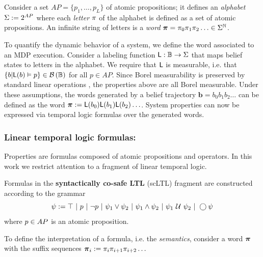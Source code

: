 \documentclass{ifacconf}
\begin{document}
Consider a set $AP = \{ p_1, \ldots, p_L \}$ of atomic propositions; it defines an \emph{alphabet} $\Sigma := 2^{AP}$ where each \emph{letter} $\pi$ of the alphabet is defined as a set of atomic propositions. An infinite string of letters is a \emph{word} ${\boldsymbol{\pi}}=\pi_0\pi_1\pi_2\ldots\in\Sigma^{\mathbb{N}}$.

To quantify the dynamic behavior of a system, we define the word associated to an MDP execution. Consider a labeling function $\mathsf{L}:\mathbb{B}\rightarrow \Sigma$ that maps belief states to letters in the alphabet. We require that $\mathsf{L}$ is measurable, i.e. that $\{b|\mathsf{L}(b)\vDash p \}\in \mathcal{B}\left(\mathbb{B}\right)$ for all $p \in AP$. Since Borel measurability is preserved by standard linear operations \citep{azoff1974borel}%
, the properties above are all Borel measurable. Under these assumptions, the words generated by a belief trajectory $\mathbf{b} = b_0 b_1 b_2 \ldots$ can be defined as the word ${\boldsymbol{\pi}}:=\mathsf{L}(b_0)\mathsf{L}(b_1) \mathsf{L}(b_2) \ldots$. System properties can now be expressed via temporal logic formulas over the generated words. 
  
\subsubsection{Linear temporal logic formulas:}

Properties are formulas composed of atomic propositions and operators. In this work we restrict attention to a fragment of linear temporal logic. 
\begin{definition}
  \label{def:gdtl-syntax}
  Formulas in the \textbf{syntactically co-safe LTL} (scLTL) fragment are constructed according to the grammar
  \begin{equation*}
    \label{eq:scLTL}
    \psi :=  \True \ |\ p \ |\ \notltl p \ |\ \psi_1 \vee\psi_2  \ |\ \psi_1 \andltl \psi_2 \ |\ \psi_1 \Until \psi_2 \ |\ \Next \psi
  \end{equation*} 
  where $p\in {AP}$ is an atomic proposition.  
\end{definition}

To define the interpretation of a formula, i.e. the \emph{semantics}, consider a word ${\boldsymbol{\pi}}$ with the suffix sequences ${\boldsymbol{\pi}}_i:= \pi_i \pi_{i+1} \pi_{i+2} \ldots$
\end{document}
